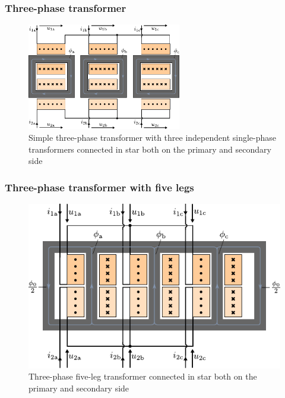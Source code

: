 \begin{frame}
	\frametitle{Three-phase transformer}
	\begin{figure}
		\includegraphics[width=0.6\textwidth]{fig/lec04/Three_phase_transformer_simple.pdf}
		\caption{Simple three-phase transformer with three independent single-phase transformers connected in star both on the primary and secondary side}
		\label{fig:Three_phase_transformer_simple}
	\end{figure}
\end{frame}

\begin{frame}
	\frametitle{Three-phase transformer with five legs}
	\begin{figure}
		\includegraphics[height=0.75\textheight]{fig/lec04/Three_phase_transformer_5_legs.pdf}
		\caption{Three-phase five-leg transformer connected in star both on the primary and secondary side}
		\label{fig:Three_phase_transformer_5_legs}
	\end{figure}
\end{frame}


